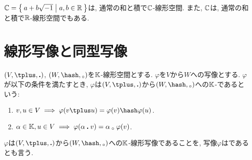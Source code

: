 

\begin{example}
\label{ex:c:real:vecs}
  $\mathbb{C}=\Set{a+b\sqrt{-1}|a,b\in \mathbb{R}}$は,
  通常の和と積で$\mathbb{C}$-線形空間.
  また,
  $\mathbb{C}$は,
  通常の和と積で$\mathbb{R}$-線形空間でもある.
\end{example}






\section{線形写像と同型写像}
\label{sec:linmap:def}
\begin{definition}
  $(V,\plus,\act)$, $(W,\pplus,\aact)$を$\mathbb{K}$-線形空間とする.
  $\varphi$を$V$から$W$への写像とする.
  $\varphi$が以下の条件を満たすとき,
  $\varphi$は$(V,\plus,\act)$から$(W,\pplus,\aact)$への$\mathbb{K}$-であるという:
  \begin{enumerate}
    \item $v,u\in V\implies \varphi(v\plus u)=\varphi(v)\pplus\varphi(u)$.
    \item $\alpha\in \mathbb{K}, u\in V\implies \varphi(\alpha\mathbin{\boldsymbol{.}} v)=\alpha\mathbin{{}_\circ}\varphi(v)$.
  \end{enumerate}
  $\varphi$は$(V,\plus,\act)$から$(W,\pplus,\aact)$への$\mathbb{K}$-線形写像であることを,
  写像$\varphi$はであるとも言う.
\end{definition}

